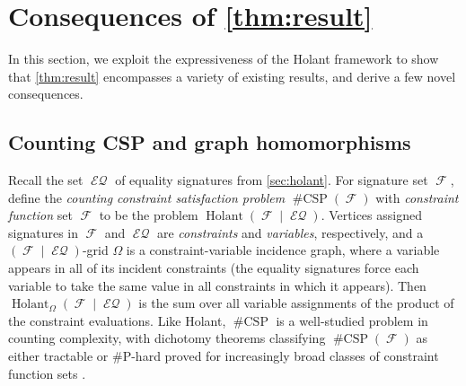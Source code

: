 \documentclass{theoretics}
\DeclareMathOperator{\fc}{\mathcal{F}}
\DeclareMathOperator{\holant}{Holant}
\DeclareMathOperator{\csp}{\#CSP}
\DeclareMathOperator{\eq}{\mathcal{EQ}}
\begin{document}
\section{Consequences of \autoref{thm:result}}
\label{sec:corollaries}
In this section, we exploit the expressiveness of the Holant framework to show that \autoref{thm:result}
encompasses a variety of existing results, and derive a few novel consequences.
\subsection{Counting CSP and graph homomorphisms}
Recall the set $\eq$ of equality signatures from \autoref{sec:holant}.
For signature set $\fc$, define the \emph{counting constraint satisfaction problem} $\csp(\fc)$
with \emph{constraint function} set $\fc$
to be the problem $\holant(\fc \mid \eq)$. Vertices assigned signatures in $\fc$ and $\eq$ are
\emph{constraints} and \emph{variables}, respectively, and a $(\fc\mid\eq)$-grid $\Omega$ is a 
constraint-variable incidence graph, where a variable appears in all of its incident constraints (the equality signatures force each variable to take the same value in all constraints in
which it appears). Then
$\holant_\Omega(\fc\mid\eq)$ is the sum over all variable assignments of the product of the constraint
evaluations.
Like Holant, $\csp$ is a well-studied
problem in counting complexity, with dichotomy theorems classifying $\csp(\fc)$ as either tractable
or \#P-hard proved for increasingly broad classes of constraint function sets 
\cite{bulatov_2013, dyer_richerby, cai-chen-lu, cai-chen-complexity}. 
\end{document}
